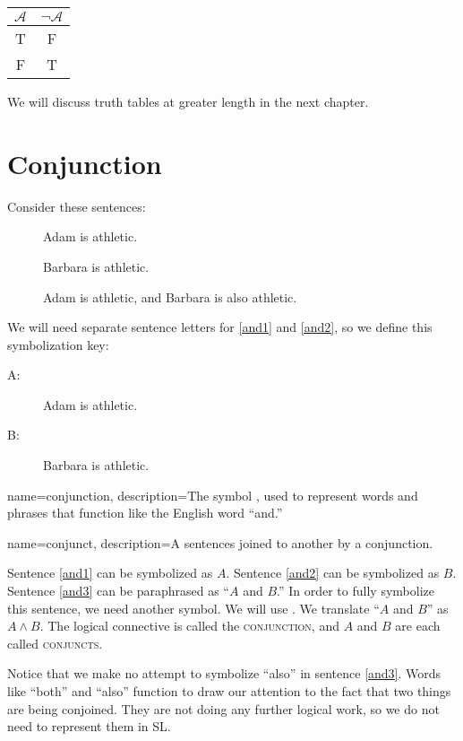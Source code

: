 \begin{table}
\begin{tabular}{c|c}
$\mathcal{A}$ & $\lnot\mathcal{A}$\\
\hline
T & F\\
F & T
\end{tabular}
\end{table}

We will discuss truth tables at greater length in the next chapter.


\section{Conjunction}
Consider these sentences:
\begin{description}
\item[]Adam is athletic.
\item[]Barbara is athletic.
\item[]Adam is athletic, and Barbara is also athletic.
\end{description}

We will need separate sentence letters for \ref{and1} and \ref{and2}, so we define this symbolization key:
\begin{description}
\item[A:] Adam is athletic.
\item[B:] Barbara is athletic.
\end{description}


{
name=conjunction,
description={The symbol \land, used to represent words and phrases that function like the English word ``and.''}
}

{
name=conjunct,
description={A sentences joined to another by a conjunction.}
}

Sentence \ref{and1} can be symbolized as $A$. Sentence \ref{and2} can be symbolized as $B$. Sentence \ref{and3} can be paraphrased as ``$A$ and $B$.'' In order to fully symbolize this sentence, we need another symbol. We will use \land. We translate ``$A$ and $B$'' as $A\land B$. The logical connective \land is called the \textsc{\gls{conjunction}}, \label{def:conjunction} and $A$ and $B$ are each called \textsc{\glspl{conjunct}}. \label{def:conjunct}

Notice that we make no attempt to symbolize ``also'' in sentence \ref{and3}. Words like ``both'' and ``also'' function to draw our attention to the fact that two things are being conjoined. They are not doing any further logical work, so we do not need to represent them in SL.

